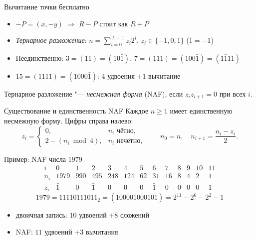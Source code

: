 \documentclass{ca-slides}
\begin{document}
\begin{canvasframe}{Вычитание точки бесплатно}
  \begin{itemize}
    \item $-P = (x, -y)$ \quad $\Rightarrow$ \quad $R - P$ стоит как $R + P$
    \item \emph{Тернарное разложение}: $n = \sum_{i=0}^{\ell-1} z_i 2^i$, \quad $z_i \in \{-1, 0, 1\}$
      \quad ($\bar 1 = -1$)
    \item Неединственно: $3 = (11) = (10\bar 1)$, \quad $7 = (111) = (100\bar 1) = (1\bar 1 11)$
    \item $15 = (1111) = (1000\bar 1)$: \quad $4$ удвоения $+ 1$ вычитание
  \end{itemize}
  \begin{definition}
    Тернарное разложение "--- \emph{несмежная форма} (NAF), если $z_i z_{i+1} = 0$ при всех $i$.
  \end{definition}
\end{canvasframe}

\begin{theoremframe}{Существование и единственность NAF}
  Каждое $n \ge 1$ имеет единственную несмежную форму. Цифры справа налево:
  \[
    z_i = \begin{cases} 0, & n_i \text{ чётно},\\ 2 - (n_i \bmod 4), & n_i \text{ нечётно},\end{cases}
    \qquad n_0 = n, \quad n_{i+1} = \frac{n_i - z_i}{2}.
  \]
\end{theoremframe}

\begin{canvasframe}{Пример: NAF числа $1979$}
  \[
  \begin{array}{c|rrrrrrrrrrrr}
    i   & 0 & 1 & 2 & 3 & 4 & 5 & 6 & 7 & 8 & 9 & 10 & 11 \\ \hline
    n_i & 1979 & 990 & 495 & 248 & 124 & 62 & 31 & 16 & 8 & 4 & 2 & 1 \\
    z_i & \bar 1 & 0 & \bar 1 & 0 & 0 & 0 & \bar 1 & 0 & 0 & 0 & 0 & 1
  \end{array}
  \]
  \[1979 = 11110111011_2 = (10000\bar 1 000\bar 1 0\bar 1) = 2^{11} - 2^6 - 2^2 - 1\]
  \begin{itemize}
    \item двоичная запись: $10$ удвоений $+ 8$ сложений
    \item NAF: $11$ удвоений $+ 3$ вычитания
  \end{itemize}
\end{canvasframe}
\end{document}
